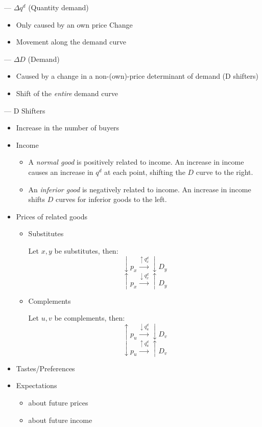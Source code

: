\documentclass{article}
\begin{document}
\begin{spacing}{1.2}
	\newpage
    --- \(\Delta q^d\) (Quantity demand)
    \begin{itemize}
        \item Only caused by an own price Change
        \item Movement along the demand curve
    \end{itemize}

    --- \(\Delta D\) (Demand)
    \begin{itemize}
        \item Caused by a change in a non-(own)-price determinant of demand (D 
        shifters)
        \item Shift of the \emph{entire} demand curve
    \end{itemize}

    --- D Shifters
    \begin{itemize}
        \item Increase in the number of buyers
        \item Income
        \begin{itemize}
            \item A \emph{normal good} is positively related to income. An 
            increase in income causes an increase in \(q^d\) at each point, 
            shifting the \(D\) curve to the right.
            \item An \emph{inferior good} is negatively related to income. An
            increase in income shifts \(D\) curves for inferior goods to the 
            left.
        \end{itemize}
        \item Prices of related goods
        \begin{itemize}
            \item Substitutes

            Let \(x, y\) be substitutes, then:
            \[\downarrow p_x \xrightarrow{\uparrow q_x^d} \downarrow D_y\]
            \[\uparrow p_x \xrightarrow{\downarrow q_x^d} \uparrow D_y\]

            \item Complements

            Let \(u, v\) be complements, then:
            \[\uparrow p_u \xrightarrow{\downarrow q_u^d}\downarrow D_v\]
            \[\downarrow p_u \xrightarrow{\uparrow q_u^d}\uparrow D_v\]
        \end{itemize}
        \item Tastes/Preferences
        \item Expectations
        \begin{itemize}
            \item about future prices
            \item about future income
        \end{itemize}
    \end{itemize}
\end{spacing}
\end{document}
